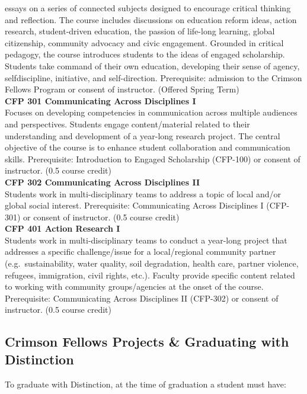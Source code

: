 \documentclass[
  letterpaper,
]{scrbook}
\begin{document}
essays on a series of connected subjects designed to encourage critical
thinking and reflection. The course includes discussions on education
reform ideas, action research, student-driven education, the passion of
life-long learning, global citizenship, community advocacy and civic
engagement. Grounded in critical pedagogy, the course introduces
students to the ideas of engaged scholarship. Students take command of
their own education, developing their sense of agency, selfdiscipline,
initiative, and self-direction. Prerequisite: admission to the Crimson
Fellows Program or consent of instructor. (Offered Spring Term)\\
\textbf{CFP 301 Communicating Across Disciplines I}\\
Focuses on developing competencies in communication across multiple
audiences and perspectives. Students engage content/material related to
their understanding and development of a year-long research project. The
central objective of the course is to enhance student collaboration and
communication skills. Prerequisite: Introduction to Engaged Scholarship
(CFP-100) or consent of instructor. (0.5 course credit)\\
\textbf{CFP 302 Communicating Across Disciplines II}\\
Students work in multi-disciplinary teams to address a topic of local
and/or global social interest. Prerequisite: Communicating Across
Disciplines I (CFP-301) or consent of instructor. (0.5 course credit)\\
\textbf{CFP 401 Action Research I}\\
Students work in multi-disciplinary teams to conduct a year-long project
that addresses a specific challenge/issue for a local/regional community
partner (e.g.~sustainability, water quality, soil degradation, health
care, partner violence, refugees, immigration, civil rights, etc.).
Faculty provide specific content related to working with community
groups/agencies at the onset of the course. Prerequisite: Communicating
Across Disciplines II (CFP-302) or consent of instructor. (0.5 course
credit)

\subsection{Crimson Fellows Projects \& Graduating with
Distinction}\label{crimson-fellows-projects-graduating-with-distinction}

To graduate with Distinction, at the time of graduation a student must
have:
\end{document}

